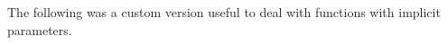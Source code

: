 \begin{code}
%
\\[\AgdaEmptyExtraSkip]%
%
\>[6]\AgdaSpace{}%
\AgdaSymbol{:}\AgdaSpace{}%
\AgdaSymbol{(}\AgdaSpace{}%
\AgdaSymbol{)}\AgdaSpace{}%
\AgdaSpace{}%
\AgdaSymbol{(}\AgdaSpace{}%
\AgdaSymbol{)}\AgdaSpace{}%
\AgdaFunction{[}\AgdaSpace{}%
\AgdaSpace{}%
\AgdaFunction{/}\AgdaSpace{}%
\AgdaSpace{}%
\AgdaFunction{]}\<%
\\
%
\>[6]\AgdaSpace{}%
\AgdaSymbol{=}\AgdaSpace{}%
\AgdaSpace{}%
\AgdaSymbol{(}\AgdaSpace{}%
\AgdaSymbol{)}\AgdaSpace{}%
\AgdaSymbol{(}\AgdaSpace{}%
\AgdaSpace{}%
\AgdaSpace{}%
\AgdaSymbol{(}\AgdaSpace{}%
\AgdaSymbol{))}\AgdaSpace{}%
\AgdaSymbol{(}\AgdaSpace{}%
\AgdaSymbol{)}\<%
\end{code}

\begin{code}%
%
\>[2]\<%
\\
\>[2][@{}l@{\AgdaIndent{0}}]%
\>[3]\<%
\\
\>[3][@{}l@{\AgdaIndent{0}}]%
\>[4]\AgdaSymbol{:}\AgdaSpace{}%
\AgdaSymbol{\{}\AgdaSpace{}%
\AgdaSymbol{:}\AgdaSpace{}%
\AgdaSpace{}%
\AgdaSymbol{\}\{}\AgdaSpace{}%
\AgdaSymbol{:}\AgdaSpace{}%
\AgdaSpace{}%
\AgdaSpace{}%
\AgdaSpace{}%
\AgdaSymbol{\}}\<%
\\
%
\>[4]\AgdaSpace{}%
\AgdaSymbol{(}\AgdaSpace{}%
\AgdaSymbol{:}\AgdaSpace{}%
\AgdaSpace{}%
\AgdaSymbol{)}\<%
\\
%
\>[4]\AgdaSpace{}%
\AgdaSymbol{((}\AgdaSpace{}%
\AgdaSymbol{:}\AgdaSpace{}%
\AgdaSymbol{)}\AgdaSpace{}%
\AgdaSpace{}%
\AgdaSpace{}%
\AgdaSymbol{(}\AgdaSpace{}%
\AgdaSymbol{))}\<%
\\
%
\>[4]\AgdaSpace{}%
\AgdaSpace{}%
\AgdaSymbol{(}\AgdaSpace{}%
\AgdaSpace{}%
\AgdaSymbol{)}\<%
\end{code}

The following was a custom version useful to deal with functions
with implicit parameters.

